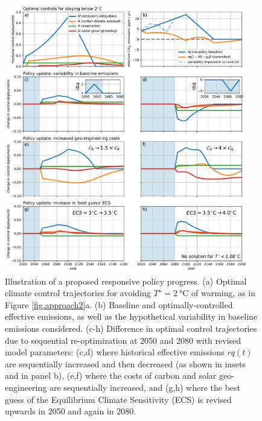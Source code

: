 \documentclass{article}
\begin{document}
\begin{figure}[htb!]
\noindent\includegraphics[width=0.95\textwidth]{figures/policy_updates.pdf}
\centering
\caption{Illustration of a proposed responsive policy progress. (a) Optimal climate control trajectories for avoiding $T^{\star} = \SI{2}{\celsius}$ of warming, as in Figure \ref{fig.approach2}a. (b) Baseline and optimally-controlled effective emissions, as well as the hypothetical variability in baseline emissions considered. (c-h) Difference in optimal control trajectories due to sequential re-optimization at 2050 and 2080 with revised model parameters: (c,d) where historical effective emissions $rq(t)$ are sequentially increased and then decreased (as shown in insets and in panel b), (e,f) where the costs of carbon and solar geo-engineering are sequentially increased, and (g,h) where the best guess of the Equilibrium Climate Sensitivity (ECS) is revised upwards in 2050 and again in 2080.}
\label{fig.policy_updates}
\end{figure}


\end{document}
